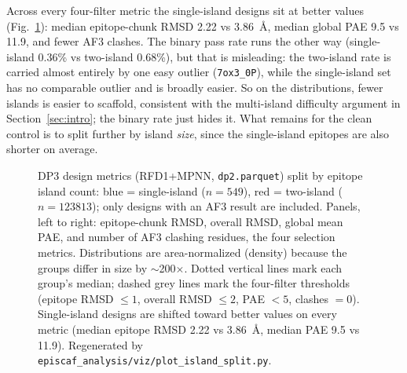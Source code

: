 Across every four-filter metric the single-island designs sit at better values
(Fig.~\ref{fig:islands}): median epitope-chunk RMSD 2.22 vs \SI{3.86}{\angstrom}, median
global PAE 9.5 vs 11.9, and fewer AF3 clashes. The binary pass rate runs the other way
(single-island 0.36\% vs two-island 0.68\%), but that is misleading: the two-island rate is
carried almost entirely by one easy outlier (\texttt{7ox3\_0P}), while the single-island set
has no comparable outlier and is broadly easier. So on the distributions, fewer islands is
easier to scaffold, consistent with the multi-island difficulty argument in
Section~\ref{sec:intro}; the binary rate just hides it. What remains for the clean control is
to split further by island \emph{size}, since the single-island epitopes are also shorter on
average.

\begin{figure}[h]\centering
{}
\caption{DP3 design metrics (RFD1+MPNN, \texttt{dp2.parquet}) split by epitope island count:
\textcolor[HTML]{1f77b4}{blue} = single-island ($n=549$),
\textcolor[HTML]{d62728}{red} = two-island ($n=\num{123813}$); only designs with an AF3
result are included. Panels, left to right: epitope-chunk RMSD, overall RMSD, global mean PAE,
and number of AF3 clashing residues, the four selection metrics. Distributions are
area-normalized (density) because the groups differ in size by $\sim$200$\times$. Dotted
vertical lines mark each group's median; dashed grey lines mark the four-filter thresholds
(epitope RMSD $\le 1$, overall RMSD $\le 2$, PAE $< 5$, clashes $= 0$). Single-island designs
are shifted toward better values on every metric (median epitope RMSD 2.22 vs
\SI{3.86}{\angstrom}, median PAE 9.5 vs 11.9). Regenerated by
\texttt{episcaf\_analysis/viz/plot\_island\_split.py}.}
\label{fig:islands}
\end{figure}
